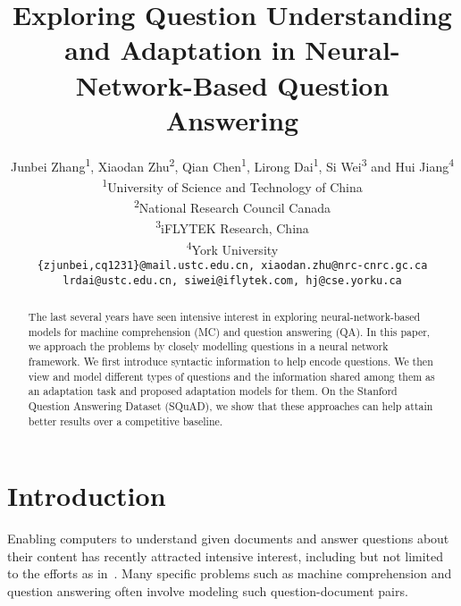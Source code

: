 \documentclass{article}
\newcommand*{\affaddr}[1]{#1} \newcommand*{\affmark}[1][*]{\textsuperscript{#1}}
\newcommand*{\email}[1]{\texttt{#1}}
\begin{document}
\title{Exploring Question Understanding and Adaptation in Neural-Network-Based Question Answering}

\author{Junbei Zhang\affmark[1], Xiaodan Zhu\affmark[2], Qian Chen\affmark[1], Lirong Dai\affmark[1], Si Wei\affmark[3] and Hui Jiang\affmark[4]\\
\affaddr{\affmark[1]University of Science and Technology of China}\\
\affaddr{\affmark[2]National Research Council Canada}\\
\affaddr{\affmark[3]iFLYTEK Research, China}\\
\affaddr{\affmark[4]York University}\\
\email{\{zjunbei,cq1231\}@mail.ustc.edu.cn, xiaodan.zhu@nrc-cnrc.gc.ca}\\
\email{lrdai@ustc.edu.cn, siwei@iflytek.com, hj@cse.yorku.ca}\\
}

\maketitle
\begin{abstract}

The last several years have seen intensive interest in exploring neural-network-based models for machine comprehension (MC) and question answering (QA). In this paper, we approach the problems by closely modelling questions in a neural network framework. We first introduce syntactic information to help encode questions. We then view and model different types of questions and the information shared among them as an adaptation task and proposed adaptation models for them. On the Stanford Question Answering Dataset (SQuAD), we show that these approaches can help attain better results over a competitive baseline. 
\end{abstract}

\noindent \section{Introduction}

Enabling computers to understand given documents and answer questions about their content has recently attracted intensive interest, including but not limited to the efforts as in~\citep{richardson2013mctest,hermann2015teaching,hill2015goldilocks,rajpurkar2016squad,Nguyen2016MS,Berant2014Modeling}. Many specific problems such as machine comprehension and question answering often involve modeling such question-document pairs.
\end{document}
